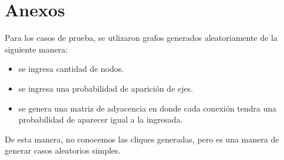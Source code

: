 \section{Anexos}
\label{anexo}

Para los casos de prueba, se utlizaron grafos generados aleatoriamente de la siguiente manera:
\begin{itemize}
 \item se ingresa cantidad de nodos.
 \item se ingresa una probabilidad de aparición de ejes.
 \item se genera una matriz de adyacencia en donde cada conexión tendra una probabilidad de aparecer igual a la ingresada.
\end{itemize}

De esta manera, no conocemos las cliques generadas, pero es una manera de generar casos aleatorios simples.
